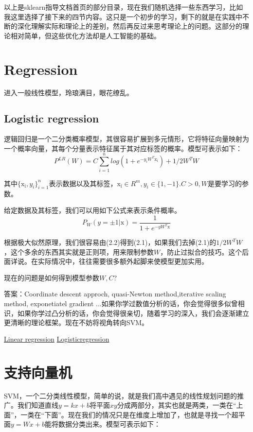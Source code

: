 以上是sklearn指导文档首页的部分目录，现在我们随机选择一些东西学习，比如我这里选择了接下来的四节内容。这只是一个初步的学习，剩下的就是在实践中不断的深化理解实际和理论上的差别，然后再反过来思考理论上的问题。这部分的理论相对简单，但这些优化方法却是人工智能的基础。

\section*{Regression}
\label{sec:lr}
进入一般线性模型，玲琅满目，眼花缭乱。
\subsection{Logistic regression}
逻辑回归是一个二分类概率模型，其很容易扩展到多元情形，它将特征向量映射为一个概率向量，其每个分量表示特征属于其对应标签的概率。模型可表示如下：
\begin{equation}
    P^{LR}(W)=C\sum_{i=1}^{n}log(1+e^{-y_{i}W^{T}\mathrm{x_i}}) + 1/2W^{T}W
\end{equation}

其中$\{\mathrm{x_i},y_i\}_{i=1}^{n}$表示数据以及其标签，$\mathrm{x_{i}}\in R^{m}, y_i \in \{1, -1\}.C>0,W$是要学习的参数。

给定数据及其标签，我们可以用如下公式来表示条件概率。
\begin{equation}
    P_{W}(y=\pm 1|\mathrm{x})=\frac{1}{1+e^{-yW^{T}\mathrm{x}}}
\end{equation}

根据极大似然原理，我们很容易由(2.2)得到(2.1)，如果我们去掉(2.1)的$1/2W^{T}W$，这个多余的东西其实就是正则项，用来限制参数$W$，防止过拟合的技巧。这个后面详说。在实际情况中，往往需要很多额外起脚来使模型更加实用。

现在的问题是如何得到模型参数$W,C$?

答案：Coordinate descent approch, quasi-Newton method,iterative scaling method, exponetiatel gradient ...如果你学过数值分析的话，你会觉得很多似曾相识，如果你学过凸分析的话，你会觉得很亲切，随着学习的深入，我们会逐渐建立更清晰的理论框架。现在不妨将视角转向SVM。

\href{https://en.wikipedia.org/wiki/Linear_regression}{Linear regression}
\href{https://en.wikipedia.org/wiki/Logistic_regression}{Logisticregression}

\section*{支持向量机}
\label{sec:SVM}
SVM，一个二分类线性模型，简单的说，就是我们高中遇见的线性规划问题的推广。我们知道直线$y=kx+b$将平面$xy$分成两部分，其实也就是两类，一类在“上面”，一类在“下面”。现在我们的情况只是在维度上增加了，也就是寻找一个超平面$y=Wx+b$能将数据分类出来。模型可表示如下：

